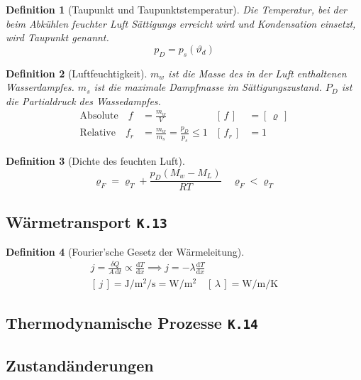 \documentclass[a4paper, twocolumn]{article}
\numberwithin{equation}{section}
\theoremstyle{hsr-def}
\newtheorem{definition}{Definition}[section]
\theoremstyle{hsr-sub}
\newcommand{\dd}[1]{\ensuremath{\mathrm{d}#1}}
\newcommand{\di}[1]{\,\dd{#1}}
\newcommand{\deriv}[2]{\ensuremath{\frac{\dd{#1}}{\dd{#2}}}}
\newcommand{\unitof}[1]{\ensuremath{\left[\,#1\,\right]}}
\newcommand{\fromlecture}[1]{\textcolor{red!70!black}{\small\texttt{K.#1}}}
\begin{document}
\begin{definition}[Taupunkt und Taupunktstemperatur]
Die Temperatur, bei der beim Abk\"uhlen feuchter Luft S\"attigungs erreicht wird und Kondensation einsetzt, wird \emph{Taupunkt} genannt.
\[
    p_D = p_s (\vartheta_d)
\]
\end{definition}

\begin{definition}[Luftfeuchtigkeit]
\(m_w\) ist die Masse des \emph{in der Luft enthaltenen} Wasserdampfes.
\(m_s\) ist die maximale Dampfmasse im S\"attigungszustand.
\(P_D\) ist die Partialdruck des Wassedampfes.
\begin{align*}
    \text{Absolute} \quad f   &= \frac{m_w}{V}                              & \unitof{f}   & = \unitof{\varrho} \\
    \text{Relative} \quad f_r &= \frac{m_w}{m_s} = \frac{p_D}{p_s} \leq 1 & \unitof{f_r} & = 1
\end{align*}
\end{definition}

\begin{definition}[Dichte des feuchten Luft]
\[
    \varrho_F = \varrho_T + \frac{p_D(M_w - M_L)}{RT}
        \quad \varrho_F < \varrho_T
\]
\end{definition}

\subsection{W\"armetransport \fromlecture{13}}

\begin{definition}[Fourier'sche Gesetz der W\"armeleitung]
\begin{gather*}
    j = \frac{\delta Q}{A\di{t}} \propto \deriv{T}{x}
    \implies
    j = -\lambda \deriv{T}{x}
    \\
    \unitof{j} = \si{\joule\per\square\metre\per\second} = \si{\watt\per\square\metre}
    \quad
    \unitof{\lambda} = \si{\watt\per\metre\per\kelvin}
\end{gather*}
\end{definition}


\subsection{Thermodynamische Prozesse \fromlecture{14}}

\subsection{Zustand\"anderungen}
\end{document}
